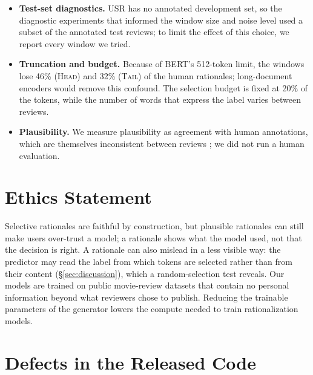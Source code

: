 \documentclass[11pt]{article}
\newcommand{\HEAD}{\textup{\textsc{Head}}}
\newcommand{\TAIL}{\textup{\textsc{Tail}}}
\begin{document}
\begin{itemize}
  \item \textbf{Test-set diagnostics.} USR has no annotated development set, so the diagnostic experiments that informed the window size and noise level used a subset of the annotated test reviews; to limit the effect of this choice, we report every window we tried.
  \item \textbf{Truncation and budget.} Because of BERT's 512-token limit, the windows lose 46\% (\HEAD) and 32\% (\TAIL) of the human rationales; long-document encoders would remove this confound. The selection budget is fixed at 20\% of the tokens, while the number of words that express the label varies between reviews.
  \item \textbf{Plausibility.} We measure plausibility as agreement with human annotations, which are themselves inconsistent between reviews \citep{storek-etal-2023-unsupervised}; we did not run a human evaluation.
\end{itemize}

\section*{Ethics Statement}

Selective rationales are faithful by construction, but plausible rationales can still make users over-trust a model; a rationale shows what the model used, not that the decision is right. A rationale can also mislead in a less visible way: the predictor may read the label from which tokens are selected rather than from their content (\S\ref{sec:discussion}), which a random-selection test reveals. Our models are trained on public movie-review datasets that contain no personal information beyond what reviewers chose to publish. Reducing the trainable parameters of the generator lowers the compute needed to train rationalization models.



\appendix

\section{Defects in the Released Code}
\label{app:defects}
\end{document}

